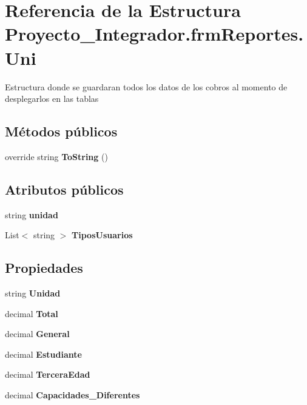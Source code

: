 \section{Referencia de la Estructura Proyecto\-\_\-\-Integrador.\-frm\-Reportes.\-Uni}
\label{struct_proyecto___integrador_1_1frm_reportes_1_1_uni}


Estructura donde se guardaran todos los datos de los cobros al momento de desplegarlos en las tablas  


\subsection*{Métodos públicos}
\begin{DoxyCompactItemize}
\item 
override string {\bf To\-String} ()
\end{DoxyCompactItemize}
\subsection*{Atributos públicos}
\begin{DoxyCompactItemize}
\item 
string {\bf unidad}
\item 
List$<$ string $>$ {\bf Tipos\-Usuarios}
\end{DoxyCompactItemize}
\subsection*{Propiedades}
\begin{DoxyCompactItemize}
\item 
string {\bf Unidad}\hspace{0.3cm}{\ttfamily  [get]}
\item 
decimal {\bf Total}\hspace{0.3cm}{\ttfamily  [get]}
\item 
decimal {\bf General}\hspace{0.3cm}{\ttfamily  [get]}
\item 
decimal {\bf Estudiante}\hspace{0.3cm}{\ttfamily  [get]}
\item 
decimal {\bf Tercera\-Edad}\hspace{0.3cm}{\ttfamily  [get]}
\item 
decimal {\bf Capacidades\-\_\-\-Diferentes}\hspace{0.3cm}{\ttfamily  [get]}
\end{DoxyCompactItemize}


